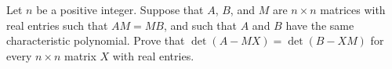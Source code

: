 Let $n$ be a positive integer. Suppose that $A$, $B$, and $M$ are $n\times n$ matrices with real entries such that $AM = MB$, and such that $A$ and $B$ have the same characteristic polynomial. Prove that $\det(A-MX) = \det(B-XM)$ for every $n\times n$ matrix $X$ with real entries. 
